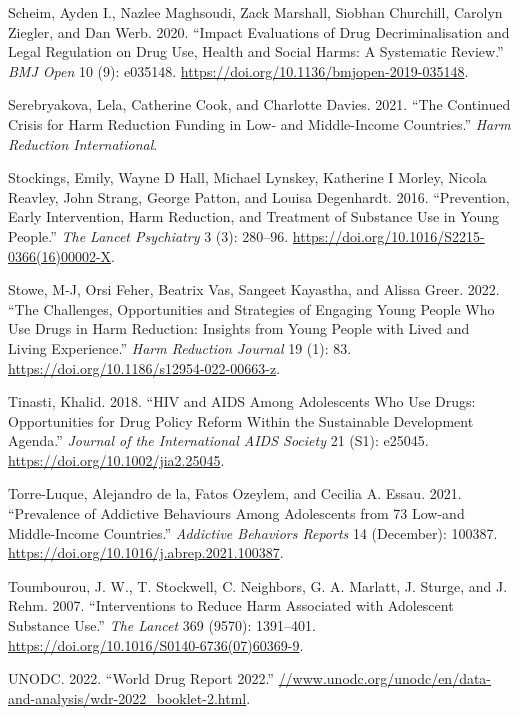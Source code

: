 \documentclass[
  letterpaper,
  DIV=11,
  numbers=noendperiod]{scrartcl}
\newlength{\cslhangindent}
\newenvironment{CSLReferences}[2] %
 {\begin{list}{}{%
  \setlength{\itemindent}{0pt}
  \setlength{\leftmargin}{0pt}
  \setlength{\parsep}{0pt}
  \ifodd #1
   \setlength{\leftmargin}{\cslhangindent}
   \setlength{\itemindent}{-1\cslhangindent}
  \fi
  \setlength{\itemsep}{#2\baselineskip}}}
 {\end{list}}
\begin{document}
\begin{CSLReferences}{1}{0}
Scheim, Ayden I., Nazlee Maghsoudi, Zack Marshall, Siobhan Churchill,
Carolyn Ziegler, and Dan Werb. 2020. {``Impact Evaluations of Drug
Decriminalisation and Legal Regulation on Drug Use, Health and Social
Harms: A Systematic Review.''} \emph{BMJ Open} 10 (9): e035148.
\url{https://doi.org/10.1136/bmjopen-2019-035148}.

Serebryakova, Lela, Catherine Cook, and Charlotte Davies. 2021. {``The
Continued Crisis for Harm Reduction Funding in Low- and Middle-Income
Countries.''} \emph{Harm Reduction International}.

Stockings, Emily, Wayne D Hall, Michael Lynskey, Katherine I Morley,
Nicola Reavley, John Strang, George Patton, and Louisa Degenhardt. 2016.
{``Prevention, Early Intervention, Harm Reduction, and Treatment of
Substance Use in Young People.''} \emph{The Lancet Psychiatry} 3 (3):
280--96. \url{https://doi.org/10.1016/S2215-0366(16)00002-X}.

Stowe, M-J, Orsi Feher, Beatrix Vas, Sangeet Kayastha, and Alissa Greer.
2022. {``The Challenges, Opportunities and Strategies of Engaging Young
People Who Use Drugs in Harm Reduction: Insights from Young People with
Lived and Living Experience.''} \emph{Harm Reduction Journal} 19 (1):
83. \url{https://doi.org/10.1186/s12954-022-00663-z}.

Tinasti, Khalid. 2018. {``HIV and AIDS Among Adolescents Who Use Drugs:
Opportunities for Drug Policy Reform Within the Sustainable Development
Agenda.''} \emph{Journal of the International AIDS Society} 21 (S1):
e25045. \url{https://doi.org/10.1002/jia2.25045}.

Torre-Luque, Alejandro de la, Fatos Ozeylem, and Cecilia A. Essau. 2021.
{``Prevalence of Addictive Behaviours Among Adolescents from 73 Low-and
Middle-Income Countries.''} \emph{Addictive Behaviors Reports} 14
(December): 100387. \url{https://doi.org/10.1016/j.abrep.2021.100387}.

Toumbourou, J. W., T. Stockwell, C. Neighbors, G. A. Marlatt, J. Sturge,
and J. Rehm. 2007. {``Interventions to Reduce Harm Associated with
Adolescent Substance Use.''} \emph{The Lancet} 369 (9570): 1391--401.
\url{https://doi.org/10.1016/S0140-6736(07)60369-9}.

UNODC. 2022. {``World Drug Report 2022.''}
\href{https:////www.unodc.org/unodc/en/data-and-analysis/wdr-2022_booklet-2.html}{//www.unodc.org/unodc/en/data-and-analysis/wdr-2022\_booklet-2.html}.


\end{CSLReferences}
\end{document}
